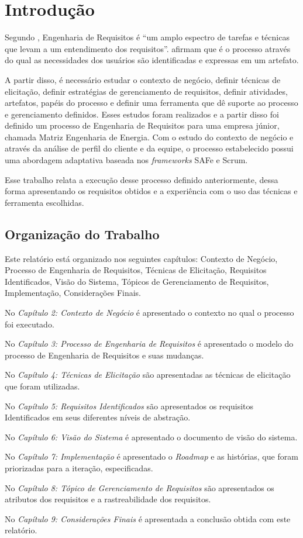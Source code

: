 \chapter[Introdução]{Introdução}

Segundo , Engenharia de Requisitos é ``um amplo
espectro de tarefas e técnicas que levam a um entendimento dos requisitos''.
 afirmam que é o processo através do qual as necessidades dos usuários 
são identificadas e expressas em um artefato.

A partir disso, é necessário estudar o contexto de negócio, definir técnicas de elicitação, 
definir estratégias de gerenciamento de requisitos, definir atividades, artefatos, papéis do processo
e definir uma ferramenta que dê suporte ao processo e gerenciamento definidos.
Esses estudos foram realizados e a partir disso foi definido um processo de Engenharia de Requisitos para uma empresa júnior, 
chamada Matriz Engenharia de Energia. Com o estudo do contexto de negócio e através da análise de perfil do cliente e da equipe, o processo
estabelecido possui uma abordagem adaptativa baseada nos \textit{frameworks} SAFe e Scrum. 

Esse trabalho relata a execução desse processo definido anteriormente, dessa forma apresentando os requisitos obtidos e 
a experiência com o uso das técnicas e ferramenta escolhidas.

\section{Organização do Trabalho}

Este relatório está organizado nos seguintes capítulos: Contexto de Negócio, Processo de Engenharia de Requisitos, Técnicas de Elicitação,
Requisitos Identificados, Visão do Sistema, Tópicos de Gerenciamento de Requisitos, Implementação, Considerações Finais.

No \textit{Capítulo 2: Contexto de Negócio} é apresentado o contexto no qual o processo foi executado.

No \textit{Capítulo 3: Processo de Engenharia de Requisitos} é apresentado o modelo do processo de Engenharia de Requisitos e suas mudanças.

No \textit{Capítulo 4: Técnicas de Elicitação} são apresentadas as técnicas de elicitação que foram utilizadas.

No \textit{Capítulo 5: Requisitos Identificados} são apresentados os requisitos Identificados em seus diferentes níveis de abstração.

No \textit{Capítulo 6: Visão do Sistema} é apresentado o documento de visão do sistema.

No \textit{Capítulo 7: Implementação} é apresentado o \textit{Roadmap} e as histórias, que foram priorizadas para a iteração, especificadas.

No \textit{Capítulo 8: Tópico de Gerenciamento de Requisitos}  são apresentados os atributos dos requisitos e a rastreabilidade dos requisitos.

No \textit{Capítulo 9: Considerações Finais} é apresentada a conclusão obtida
com este relatório.